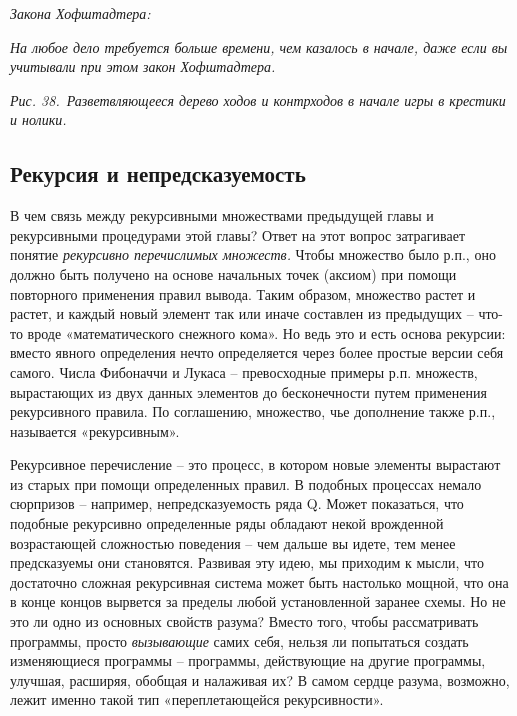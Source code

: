 \documentclass[../main.tex]{subfiles}
\begin{document}
\emph{Закона Хофштадтера:}

\emph{На любое дело требуется больше времени, чем казалось в начале, даже если вы учитывали при этом закон Хофштадтера.}

\emph{Рис. 38.~Разветвляющееся дерево ходов и контрходов в начале игры в крестики и нолики.}


\subsection{Рекурсия и непредсказуемость}

В чем связь между рекурсивными множествами предыдущей главы и рекурсивными процедурами этой главы? Ответ на этот вопрос затрагивает понятие \emph{рекурсивно перечислимых множеств.} Чтобы множество было р.п., оно должно быть получено на основе начальных точек (аксиом) при помощи повторного применения правил вывода. Таким образом, множество растет и растет, и каждый новый элемент так или иначе составлен из предыдущих \--- что-то вроде «математического снежного кома». Но ведь это и есть основа рекурсии: вместо явного определения нечто определяется через более простые версии себя самого. Числа Фибоначчи и Лукаса \--- превосходные примеры р.п. множеств, вырастающих из двух данных элементов до бесконечности путем применения рекурсивного правила. По соглашению, множество, чье дополнение также р.п., называется «рекурсивным».

Рекурсивное перечисление \--- это процесс, в котором новые элементы вырастают из старых при помощи определенных правил. В подобных процессах немало сюрпризов \--- например, непредсказуемость ряда Q. Может показаться, что подобные рекурсивно определенные ряды обладают некой врожденной возрастающей сложностью поведения \--- чем дальше вы идете, тем менее предсказуемы они становятся. Развивая эту идею, мы приходим к мысли, что достаточно сложная рекурсивная система может быть настолько мощной, что она в конце концов вырвется за пределы любой установленной заранее схемы. Но не это ли одно из основных свойств разума? Вместо того, чтобы рассматривать программы, просто \emph{вызывающие} самих себя, нельзя ли попытаться создать изменяющиеся программы \--- программы, действующие на другие программы, улучшая, расширяя, обобщая и налаживая их? В самом сердце разума, возможно, лежит именно такой тип «переплетающейся рекурсивности».
\end{document}
